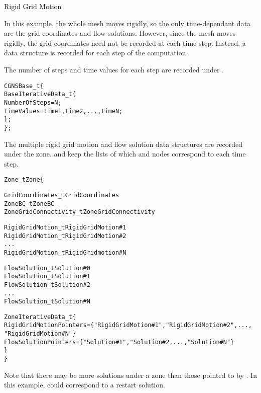 \enlargethispage{\baselineskip}
\begin{example}{Rigid Grid Motion}
\label{ex:rigidmotion}

In this example, the whole mesh moves rigidly, so the only
time-dependant data are the grid coordinates and flow solutions.
However, since the mesh moves rigidly, the grid coordinates need not be
recorded at each time step.
Instead, a  data structure is recorded for
each step of the computation.

The number of steps and time values for each step are recorded under
.

\begin{alltt}
  CGNSBase\_t \{
    BaseIterativeData\_t \{
      NumberOfSteps = N ;
      TimeValues = time1, time2, ..., timeN ;
    \} ;
  \} ;
\end{alltt}

The multiple rigid grid motion and flow solution data structures are
recorded under the zone.
 and  keep the
lists of which  and  nodes
correspond to each time step.

\begin{alltt}
  Zone\_t Zone \{

    GridCoordinates\_t GridCoordinates
    ZoneBC\_t ZoneBC
    ZoneGridConnectivity\_t ZoneGridConnectivity

    RigidGridMotion\_t RigidGridMotion\#1
    RigidGridMotion\_t RigidGridMotion\#2
    ...
    RigidGridMotion\_t RigidGridmotion\#N

    FlowSolution\_t Solution\#0
    FlowSolution\_t Solution\#1
    FlowSolution\_t Solution\#2
    ...
    FlowSolution\_t Solution\#N

    ZoneIterativeData\_t \{
      RigidGridMotionPointers = \{"RigidGridMotion\#1", "RigidGridMotion\#2", ...,
         "RigidGridMotion\#N"\}
      FlowSolutionPointers = \{"Solution\#1", "Solution\#2, ..., "Solution\#N"\}
    \}
  \}
\end{alltt}

Note that there may be more solutions under a zone than those pointed to
by .
In this example,  could correspond to a restart solution.
\end{example}

